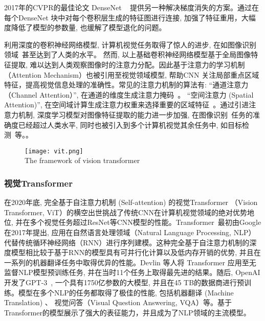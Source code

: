 2017年的CVPR的最佳论文 DenseNet ~\cite{huang2017densely} 提供另一种解决梯度消失的方案。通过在每个DenseNet 块中对每个卷积层生成的特征图进行连接, 加强了特征重用，大幅度降低了模型的参数量, 也缓解了模型退化的问题。 \par
利用深度的卷积神经网络模型, 计算机视觉任务取得了惊人的进步, 在如图像识别领域~\cite{xiebaojian,hongtao16,yafeili18,changliang16, chuminnan15, zhuangzhuang16}甚至达到了人类的水平。 然而, 以上基础卷积神经网络模型基于全局图像特征提取, 难以达到人类观察图像时的注意力分配。因此基于注意力的学习机制 （Attention Mechanism）也被引用至视觉领域模型, 帮助CNN 关注局部重点区域特征，提高视觉信息处理的准确性。常见的注意力机制的算法有: ``通道注意力（Channel Attention）'', 在通道的维度生成注意力掩码~\cite{hu2018squeeze,liu2022spatial, zhang2018context,gao2019global,yang2020gated, chen2019you}。 ``空间注意力 (Spatial Attention)'', 在空间域计算生成注意力权重来选择重要的区域特征~\cite{wang2018non,gregor2015draw,mnih2014recurrent, jaderberg2015spatial}。通过引进注意力机制, 深度学习模型对图像特征提取的能力进一步加强, 在图像识别~\cite{zzzl2019, zhangwenxiu, helloxucong}任务的准确度已经超过人类水平, 同时也被引入到多个计算机视觉其余任务中, 如目标检测~\cite{hongyanli1999,jmr2021, lsen2021, xc2019, zwq2020}等。。
\begin{figure}[!htp]
    \centering
    \texttt{[image: vit.png]} \\
      {The framework of vision transformer}
   \label{fig:vit}
  \end{figure}

\subsubsection{视觉Transformer}
在2020年底, 完全基于自注意力机制 (Self-attention) 的视觉Transformer （Vision Transformer, ViT）的横空出世挑战了传统CNN在计算机视觉领域的绝对优势地位, 并在多个视觉任务超过ResNet等CNN模型的性能。Transformer~\cite{vaswani2017attention}最初由Google在2017年提出, 应用在自然语言处理领域（Natural Language Processing, NLP）代替传统循环神经网络（RNN）进行序列建模。这种完全基于自注意力机制的深度模型相比较于基于RNN的模型具有可并行化计算以及低内存开销的优势, 并且在一系列的机器翻译任务中取得优异的性能。Devlin 等人将 Transformer \cite{devlin2018bert} 应用至无监督NLP模型预训练任务, 并在当时11个任务上取得最先进的结果。随后, OpenAI开发了GPT-3~\cite{brown2020language}, 一个具有1750亿参数的大模型, 并且在45 TB的数据商进行预训练。模型在多个NLP的任务都取得了极佳的性能, 包括机器翻译 (Machine Translation) 、 视觉问答（Visual Question Answering, VQA）等。基于Transformer的模型展示了强大的表征能力，并且成为了NLP领域的主流模型。\par

